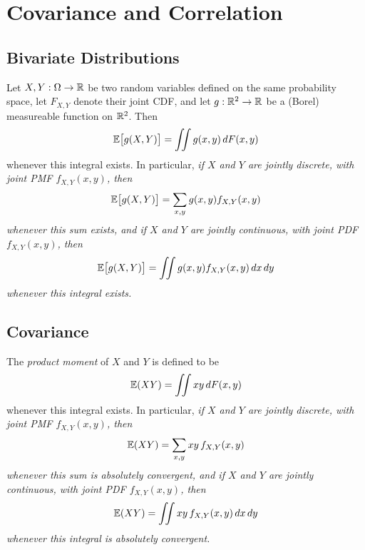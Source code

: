 \chapter{Covariance and Correlation}\label{chap:cov}
\section{Bivariate Distributions}
\begin{definition}
Let $X,Y:\Omega\to\mathbb{R}$ be two random variables defined on the same probability space, let $F_{X,Y}$ denote their joint CDF, and let $g:\mathbb{R}^2\to\mathbb{R}$ be a (Borel) measureable function on $\mathbb{R}^2$. Then%
\[
\mathbb{E}\big[g(X,Y)\big] = \iint g(x,y)\,dF(x,y)
\]
whenever this integral exists. In particular,
\ben
\it %
if $X$ and $Y$ are jointly discrete, with joint PMF $f_{X,Y}(x,y)$, then 
\[
\mathbb{E}\big[g(X,Y)\big] = \sum_{x,y} g(x,y)f_{X,Y}(x,y)
\]
whenever this sum exists, and
\it %
if $X$ and $Y$ are jointly continuous, with joint PDF $f_{X,Y}(x,y)$, then
\[
\mathbb{E}\big[g(X,Y)\big] = \iint g(x,y)f_{X,Y}(x,y)\,dx\,dy
\]
whenever this integral exists.
\een
\end{definition}

\section{Covariance}
\begin{definition}
The \emph{product moment} of $X$ and $Y$ is defined to be
\[
\mathbb{E}(XY) = \iint xy\,dF(x,y)
\]
whenever this integral exists. In particular, 
\ben
\it %
if $X$ and $Y$ are jointly discrete, with joint PMF $f_{X,Y}(x,y)$, then
\[
\mathbb{E}(XY) = \sum_{x,y} xy\, f_{X,Y}(x,y)
\]
whenever this sum is absolutely convergent, and
\it %
if $X$ and $Y$ are jointly continuous, with joint PDF $f_{X,Y}(x,y)$, then
\[
\mathbb{E}(XY) = \iint xy\, f_{X,Y}(x,y)\,dx\,dy
\]
whenever this integral is absolutely convergent.
\een
\end{definition}
%
%



